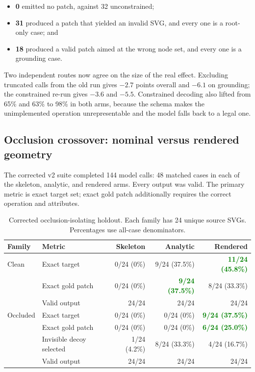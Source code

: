 \documentclass[10pt,a4paper]{article}
\newcommand{\good}[1]{\textcolor{green}{\textbf{#1}}}
\newcommand{\code}[1]{\texttt{\detokenize{#1}}}
\begin{document}
\begin{itemize}
  \item \textbf{0} emitted no patch, against 32 unconstrained;
  \item \textbf{31} produced a patch that yielded an invalid SVG, and every one
  is a root-only case; and
  \item \textbf{18} produced a valid patch aimed at the wrong node set, and
  every one is a grounding case.
\end{itemize}

Two independent routes now agree on the size of the real effect. Excluding
truncated calls from the old run gives \(-2.7\) points overall and \(-6.1\) on
grounding; the constrained re-run gives \(-3.6\) and \(-5.5\). Constrained
decoding also lifted \code{upside_down} from 65\% and 63\% to 98\% in both
arms, because the schema makes the unimplemented \code{transform} operation
unrepresentable and the model falls back to a legal one.

\subsection{Occlusion crossover: nominal versus rendered geometry}
\label{sec:occlusion-crossover}

The corrected v2 suite completed 144 model calls: 48 matched cases in each of
the skeleton, analytic, and rendered arms. Every output was valid. The primary
metric is exact target set; exact gold patch additionally requires the correct
operation and attributes.

\begin{table}[H]
\centering
\caption{Corrected occlusion-isolating holdout. Each family has 24 unique
source SVGs. Percentages use all-case denominators.}
\begin{tabular}{@{}llrrr@{}}
\toprule
\textbf{Family} & \textbf{Metric} & \textbf{Skeleton} &
\textbf{Analytic} & \textbf{Rendered}\\
\midrule
Clean & Exact target & 0/24 (0\%) & 9/24 (37.5\%) &
  \good{11/24 (45.8\%)}\\
 & Exact gold patch & 0/24 (0\%) & \good{9/24 (37.5\%)} &
  8/24 (33.3\%)\\
 & Valid output & 24/24 & 24/24 & 24/24\\
\addlinespace
Occluded & Exact target & 0/24 (0\%) & 0/24 (0\%) &
  \good{9/24 (37.5\%)}\\
 & Exact gold patch & 0/24 (0\%) & 0/24 (0\%) &
  \good{6/24 (25.0\%)}\\
 & Invisible decoy selected & 1/24 (4.2\%) & 8/24 (33.3\%) &
  4/24 (16.7\%)\\
 & Valid output & 24/24 & 24/24 & 24/24\\
\bottomrule
\end{tabular}
\end{table}
\end{document}
